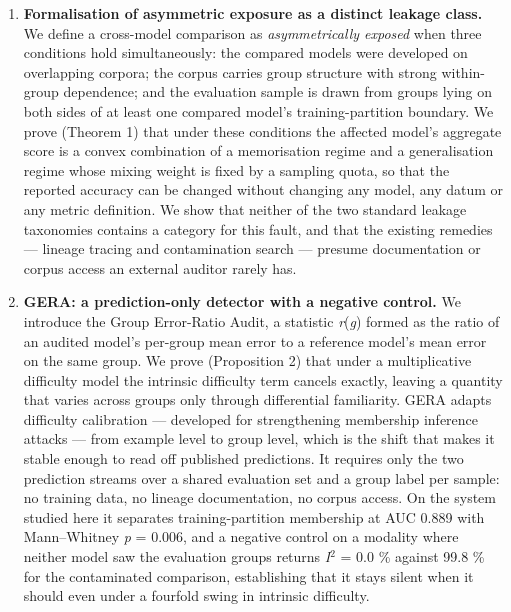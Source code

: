\begin{enumerate}
\item \textbf{Formalisation of asymmetric exposure as a distinct leakage class.} We define a cross-model comparison as \emph{asymmetrically exposed} when three conditions hold simultaneously: the compared models were developed on overlapping corpora; the corpus carries group structure with strong within-group dependence; and the evaluation sample is drawn from groups lying on both sides of at least one compared model's training-partition boundary. We prove (Theorem 1) that under these conditions the affected model's aggregate score is a convex combination of a memorisation regime and a generalisation regime whose mixing weight is fixed by a sampling quota, so that the reported accuracy can be changed without changing any model, any datum or any metric definition. We show that neither of the two standard leakage taxonomies  contains a category for this fault, and that the existing remedies --- lineage tracing  and contamination search  --- presume documentation or corpus access an external auditor rarely has.

\item \textbf{GERA: a prediction-only detector with a negative control.} We introduce the Group Error-Ratio Audit, a statistic \emph{r}(\emph{g}) formed as the ratio of an audited model's per-group mean error to a reference model's mean error on the same group. We prove (Proposition 2) that under a multiplicative difficulty model the intrinsic difficulty term cancels exactly, leaving a quantity that varies across groups only through differential familiarity. GERA adapts difficulty calibration --- developed for strengthening membership inference attacks  --- from example level to group level, which is the shift that makes it stable enough to read off published predictions. It requires only the two prediction streams over a shared evaluation set and a group label per sample: no training data, no lineage documentation, no corpus access. On the system studied here it separates training-partition membership at AUC 0.889 with Mann--Whitney \emph{p} = 0.006, and a negative control on a modality where neither model saw the evaluation groups returns \emph{I}$^{2}$ = 0.0 \% against 99.8 \% for the contaminated comparison, establishing that it stays silent when it should even under a fourfold swing in intrinsic difficulty.


\end{enumerate}
